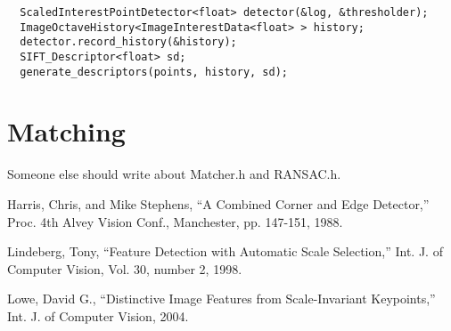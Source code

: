 \begin{verbatim}
  ScaledInterestPointDetector<float> detector(&log, &thresholder);
  ImageOctaveHistory<ImageInterestData<float> > history;
  detector.record_history(&history);
  SIFT_Descriptor<float> sd;
  generate_descriptors(points, history, sd);
\end{verbatim}

\section{Matching}
Someone else should write about Matcher.h and RANSAC.h.

\begin{thebibliography}{1}
 Harris, Chris, and Mike Stephens, ``A Combined
  Corner and Edge Detector,'' Proc. 4th Alvey Vision Conf., Manchester,
  pp. 147-151, 1988.

 Lindeberg, Tony, ``Feature Detection with Automatic
  Scale Selection,''  Int. J. of Computer Vision, Vol. 30, number 2,
  1998.

 Lowe, David G., ``Distinctive Image Features from
  Scale-Invariant Keypoints,'' Int. J. of Computer Vision, 2004.

\end{thebibliography}

